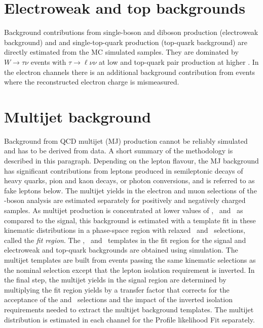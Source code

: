 \chapter{Electroweak and top backgrounds}
\label{sec:ewtopbkgs}


Background contributions from single-boson and diboson production (electroweak background)
and \ttbar and single-top-quark production (top-quark background)
are directly estimated from 
the MC simulated samples. They are dominated by $W \to \tau\nu$
events with $\tau \to \ell\nu\nu$ at low \ut and top-quark pair
production at higher \ut. In the electron channels there is an
additional background contribution from \Wenu events where the reconstructed electron
charge is mismeasured.

\chapter{Multijet background}
\label{sec:mjbkg}

Background from QCD multijet (MJ) production cannot be reliably
simulated and has to be derived from data. A short summary of the methodology is described in this paragraph. 
Depending on the lepton
flavour, the MJ background has significant contributions from 
leptons produced in semileptonic decays of heavy quarks, pion and kaon decays,
or photon conversions, and is referred to as fake leptons below. The multijet yields in the electron and muon selections of the
\Wboson-boson analysis are estimated separately for positively and negatively
charged samples. As multijet production is concentrated at lower
values of \ptl, \met\ and \mt\ as compared to the signal, this
background is estimated with a template fit in these kinematic
distributions in a phase-space region with relaxed \met\ and \mt\
selections, called the \textit{fit region}. The \ptl, \met\ and \mt\ templates in the fit region
for the \Wln signal and electroweak and top-quark
backgrounds are obtained using simulation. The multijet templates are
built from events passing the same kinematic selections as the nominal
selection except that the lepton isolation requirement is inverted.
In the final step, the multijet yields in the signal region are
determined by multiplying the fit region yields by a transfer factor
that corrects for the
acceptance of the \met and \mt\ selections and the impact of the inverted isolation
requirements needed to extract the multijet background templates. The multijet distribution is estimated in each channel for the Profile likelihood Fit separately. 

